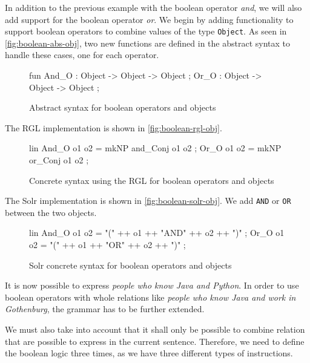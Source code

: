 In addition to the previous example with the boolean operator \emph{and}, we will also add support for the boolean operator \emph{or}. We begin by adding functionality to support boolean operators to combine values of the type \texttt{Object}. As seen in \autoref{fig:boolean-abs-obj}, two new functions are defined in the abstract syntax to handle these cases, one for each operator.

\begin{figure}[H]
\begin{code}
fun
  And_O : Object -> Object -> Object ;
  Or_O : Object -> Object -> Object ;
\end{code}
\caption{Abstract syntax for boolean operators and objects\label{fig:boolean-abs-obj}}
\end{figure}

The RGL implementation is shown in \autoref{fig:boolean-rgl-obj}.

\begin{figure}[H]
\begin{code}
lin
  And_O o1 o2 = mkNP and_Conj o1 o2 ;
  Or_O o1 o2 = mkNP or_Conj o1 o2 ;
\end{code}
\caption{Concrete syntax using the RGL for boolean operators and objects\label{fig:boolean-rgl-obj}}
\end{figure}

The Solr implementation is shown in \autoref{fig:boolean-solr-obj}. We add \texttt{AND} or \texttt{OR} between the two objects.

\begin{figure}[H]
\begin{code}
lin
  And_O o1 o2 = "(" ++ o1 ++ "AND" ++ o2 ++ ")" ;
  Or_O o1 o2 = "(" ++ o1 ++ "OR" ++ o2 ++ ")" ;
\end{code}
\caption{Solr concrete syntax for boolean operators and objects\label{fig:boolean-solr-obj}}
\end{figure}

It is now possible to express \emph{people who know Java and Python}. In order to use boolean operators with whole relations like \emph{people who know Java and work in Gothenburg}, the grammar has to be further extended.

We must also take into account that it shall only be possible to combine relation that are possible to express in the current sentence. Therefore, we need to define the boolean logic three times, as we have three different types of instructions.


